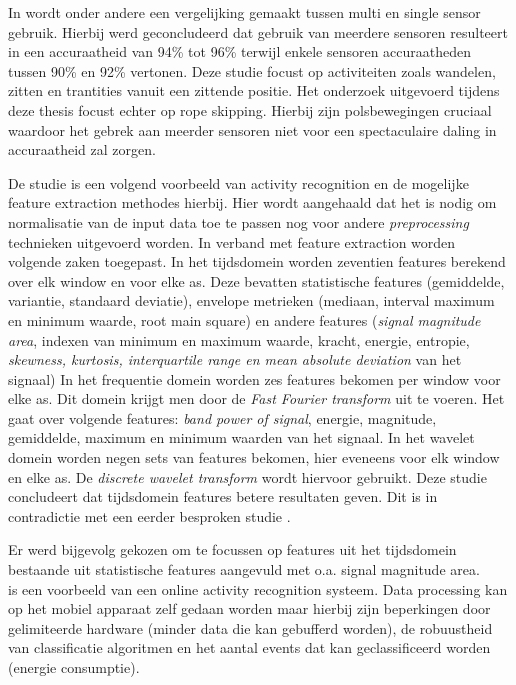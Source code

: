 In \cite{ref76} wordt onder andere een vergelijking gemaakt tussen multi en single sensor gebruik. Hierbij werd geconcludeerd dat gebruik van meerdere sensoren resulteert in een accuraatheid van 94\% tot 96\% terwijl enkele sensoren accuraatheden tussen 90\% en 92\% vertonen. Deze studie focust op activiteiten zoals wandelen, zitten en trantities vanuit een zittende positie. Het onderzoek uitgevoerd tijdens deze thesis focust echter op rope skipping. Hierbij zijn polsbewegingen cruciaal waardoor het gebrek aan meerder sensoren niet voor een spectaculaire daling in accuraatheid zal zorgen.

De studie \citep{ref16} is een volgend voorbeeld van activity recognition en de mogelijke feature extraction methodes hierbij.
Hier wordt aangehaald dat het is nodig om normalisatie van de input data toe te passen nog voor andere \textit{preprocessing} technieken uitgevoerd worden.
In verband met feature extraction worden volgende zaken toegepast. In het tijdsdomein worden zeventien features berekend over elk window en voor elke as. Deze bevatten statistische features (gemiddelde, variantie, standaard deviatie), envelope metrieken (mediaan, interval maximum en minimum waarde, root main square) en andere features (\textit{signal magnitude area}, indexen van minimum en maximum waarde, kracht, energie, entropie, \textit{skewness, kurtosis, interquartile range en mean absolute deviation} van het signaal)
In het frequentie domein worden zes features bekomen per window voor elke as. Dit domein krijgt men door de \textit{Fast Fourier transform} uit te voeren. Het gaat over volgende features: \textit{band power of signal}, energie, magnitude, gemiddelde, maximum en minimum waarden van het signaal.
In het wavelet domein worden negen sets van features bekomen, hier eveneens voor elk window en elke as. De \textit{discrete wavelet transform} wordt hiervoor gebruikt. 
Deze studie concludeert dat tijdsdomein features betere resultaten geven. Dit is in contradictie met een eerder besproken studie \citep{ref15}. 

Er werd bijgevolg gekozen om te focussen op features uit het tijdsdomein bestaande uit statistische features aangevuld met o.a. signal magnitude area. \\

\citep{ref17} is een voorbeeld van een online activity recognition systeem. 
Data processing kan op het mobiel apparaat zelf gedaan worden maar hierbij zijn beperkingen door gelimiteerde hardware  (minder data die kan gebufferd worden), de robuustheid van classificatie algoritmen en het aantal events dat kan geclassificeerd worden (energie consumptie). 

